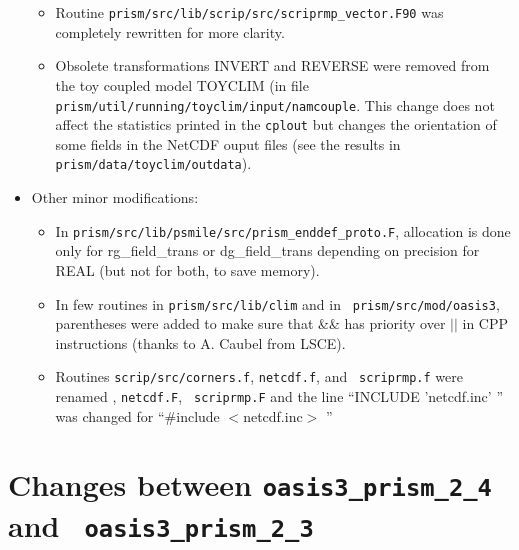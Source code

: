 \begin{itemize}
\begin{itemize}
  \item Routine {\tt prism/src/lib/scrip/src/scriprmp\_vector.F90} was
    completely rewritten for more clarity.

  \item Obsolete transformations INVERT and REVERSE were removed from
    the toy coupled model TOYCLIM (in file {\tt
      prism/util/running/toyclim/input/namcouple}. This change does
    not affect the statistics printed in the {\tt cplout} but changes
    the orientation of some fields in the NetCDF ouput files (see the
    results in {\tt prism/data/toyclim/outdata}).

\end{itemize}

\item Other minor modifications:

  \begin{itemize}

  \item In {\tt prism/src/lib/psmile/src/prism\_enddef\_proto.F},
    allocation is done only for rg\_field\_trans or dg\_field\_trans
    depending on precision for REAL (but not for both, to save
    memory).

  \item In few routines in {\tt prism/src/lib/clim} and in {\tt
      prism/src/mod/oasis3}, parentheses were added to make sure that
    \&\& has priority over $|$$|$ in CPP instructions (thanks to A.
    Caubel from LSCE).


  \item Routines {\tt scrip/src/corners.f}, {\tt netcdf.f}, and {\tt
      scriprmp.f} were renamed , {\tt netcdf.F}, {\tt
      scriprmp.F} and the line ``INCLUDE 'netcdf.inc' '' was changed
    for ``\#include $<$netcdf.inc$>$ ''

  \end{itemize}

\end{itemize}

\section{Changes between {\tt oasis3\_prism\_2\_4} and {\tt
      oasis3\_prism\_2\_3}}

